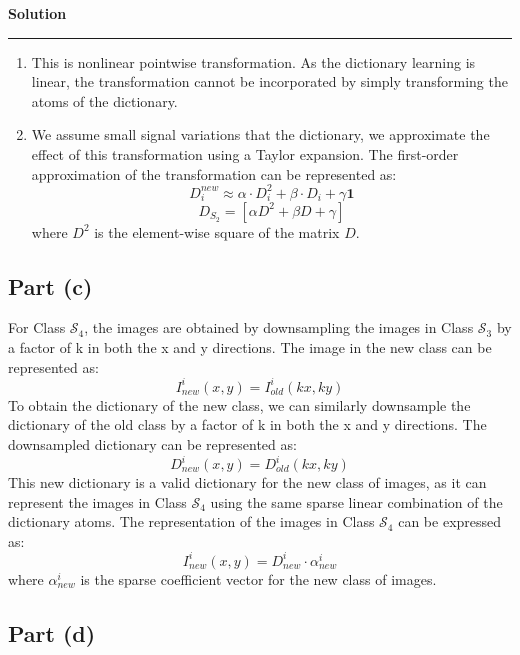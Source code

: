 \documentclass[a4paper,12pt]{article}
\newenvironment{solution}[2][]{%
    \begin{mdframed}[linecolor=blue!70!black, linewidth=2pt, roundcorner=10pt, backgroundcolor=yellow!10!white, skipabove=12pt, skipbelow=12pt]%
        \textbf{\large #2}
        \par\noindent\rule{\textwidth}{0.4pt}
}{
    \end{mdframed}
}
\begin{document}
\begin{solution}{Solution}
\begin{enumerate}
    \item This is nonlinear pointwise transformation. As the dictionary learning is linear, the transformation cannot be incorporated by simply transforming the atoms of the dictionary.
    \item We assume small signal variations that the dictionary, we approximate the effect of this transformation using a Taylor expansion. The first-order approximation of the transformation can be represented as:
    \begin{equation}
        D_i^{new} \approx \alpha \cdot D_i^2 + \beta \cdot D_i + \gamma \mathbf{1}
    \end{equation}
    \begin{equation}
        D_{S_2} = \left[ \alpha D^2 + \beta D + \gamma \right]
    \end{equation}
    where $D^2$ is the element-wise square of the matrix $D$.
\end{enumerate}


\subsection*{Part (c)}
For Class $\mathcal{S}_4$, the images are obtained by downsampling the images in Class $\mathcal{S}_3$ by a factor of k in both the x and y directions. The image in the new class can be represented as:
\begin{equation}
    I^i_{new}(x, y) = I^i_{old}(kx, ky)
\end{equation}
To obtain the dictionary of the new class, we can similarly downsample the dictionary of the old class by a factor of k in both the x and y directions. The downsampled dictionary can be represented as:
\begin{equation}
    D^i_{new}(x, y) = D^i_{old}(kx, ky)
\end{equation}
This new dictionary is a valid dictionary for the new class of images, as it can represent the images in Class $\mathcal{S}_4$ using the same sparse linear combination of the dictionary atoms. The representation of the images in Class $\mathcal{S}_4$ can be expressed as:
\begin{equation}
    I^i_{new}(x, y) = D^i_{new} \cdot \alpha^i_{new}
\end{equation}
where $\alpha^i_{new}$ is the sparse coefficient vector for the new class of images. 


\subsection*{Part (d)}


\end{solution}
\end{document}
